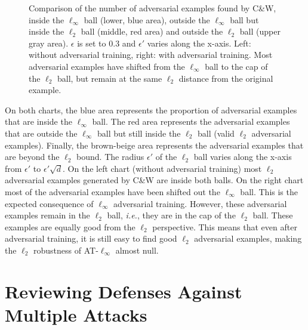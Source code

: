 \begin{figure}[htb]
    \centering
    
    \caption{Comparison of the number of adversarial examples found by C\&W, inside the $\ell_\infty$ ball (lower, blue area), outside the $\ell_\infty$ ball but inside the $\ell_2$ ball (middle, red area) and outside the $\ell_2$ ball (upper gray area). $\epsilon$ is set to $0.3$ and $\epsilon'$ varies along the x-axis. Left: without adversarial training, right: with adversarial training. Most adversarial examples have shifted from the $\ell_\infty$ ball to the cap of the $\ell_2$ ball, but remain at the same $\ell_2$ distance from the original example.}
    \label{fig:calotte}
\end{figure}

On both charts, the blue area represents the proportion of adversarial examples that are inside the $\ell_\infty$ ball. The red area represents the adversarial examples that are outside the $\ell_\infty$ ball but still inside the $\ell_2$ ball (valid $\ell_2$ adversarial examples). Finally, the brown-beige area represents the adversarial examples that are beyond the $\ell_2$ bound. The radius $\epsilon'$ of the $\ell_2$ ball varies along the x-axis from $\epsilon'$ to $\epsilon' \sqrt{d}$. On the left chart (without adversarial training) most $\ell_2$ adversarial examples generated by C\&W are inside both balls. On the right chart most of the adversarial examples have been shifted out the $\ell_\infty$ ball. This is the expected consequence of $\ell_\infty$ adversarial training. However, these adversarial examples remain in the $\ell_2$ ball, \emph{i.e.}, they are in the cap of the $\ell_2$ ball. These examples are equally good from the $\ell_2$ perspective. This means that even after adversarial training, it is still easy to find good $\ell_2$ adversarial examples, making the $\ell_2$ robustness of AT-$\ell_\infty$ almost null. 


\section{Reviewing Defenses Against Multiple Attacks}
\label{sec:building_defense_mechanisms}

